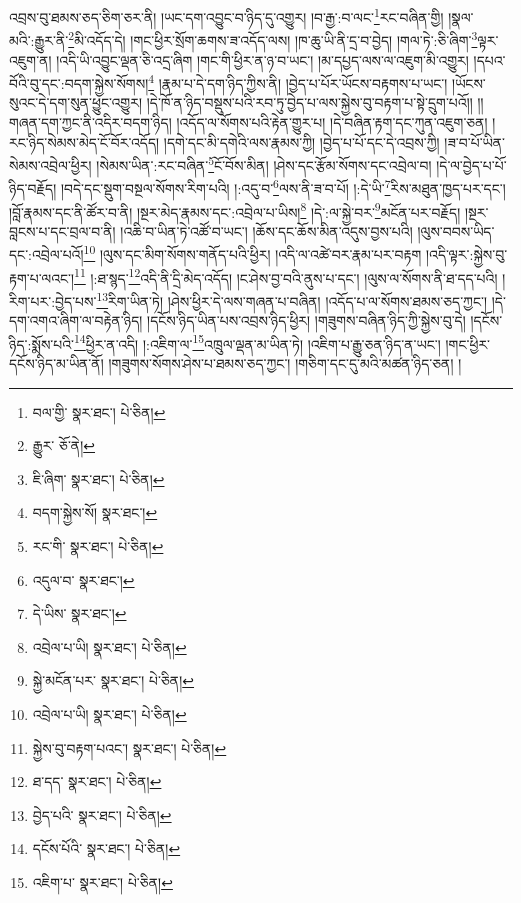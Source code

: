 འབྲས་བུ་ཐམས་ཅད་ཅིག་ཅར་ནི། །ཡང་དག་འབྱུང་བ་ཉིད་དུ་འགྱུར། །བ་རྒྱ་:བ་ལང་\footnote{བལ་གྱི་  སྣར་ཐང་།  པེ་ཅིན། }རང་བཞིན་གྱི། །སྣལ་མའི་:རྒྱུར་ནི་\footnote{རྒྱུར་  ཅོ་ནེ། }མི་འདོད་དེ། །གང་ཕྱིར་སྲོག་ཆགས་ཟ་འདོད་ལས། །ཁ་ཆུ་ཡི་ནི་དྲ་བ་བྱེད། །གལ་ཏེ་:ཅི་ཞིག་\footnote{ཇི་ཞིག་  སྣར་ཐང་།  པེ་ཅིན། }ལྟར་འཇུག་ན། །འདི་ཡི་འབྱུང་ལྡན་ཅི་འདྲ་ཞིག །གང་གི་ཕྱིར་ན་ཉ་བ་ཡང་། །མ་དཔྱད་ལས་ལ་འཇུག་མི་འགྱུར། །དཔའ་བོའི་བུ་དང་:བདག་སྐྱེས་སོགས།\footnote{བདག་སྐྱེས་སོ།  སྣར་ཐང་། } །རྣམ་པ་དེ་དག་ཉིད་ཀྱིས་ནི། །བྱེད་པ་པོར་ཡོངས་བརྟགས་པ་ཡང་། །ཡོངས་སུའང་དེ་དག་སུན་ཕྱུང་འགྱུར། །དེ་ཁོ་ན་ཉིད་བསྡུས་པའི་རབ་ཏུ་བྱེད་པ་ལས་སྐྱེས་བུ་བརྟག་པ་སྟེ་དྲུག་པའོ།། །།གཞན་དག་ཀྱང་ནི་འདིར་བདག་ཉིད། །འདོད་ལ་སོགས་པའི་རྟེན་གྱུར་པ། །དེ་བཞིན་རྟག་དང་ཀུན་འཇུག་ཅན། །རང་ཉིད་སེམས་མེད་ངོ་བོར་འདོད། །དགེ་དང་མི་དགེའི་ལས་རྣམས་ཀྱི། །བྱེད་པ་པོ་དང་དེ་འབྲས་ཀྱི། །ཟ་བ་པོ་ཡིན་སེམས་འབྲེལ་ཕྱིར། །སེམས་ཡིན་:རང་བཞིན་\footnote{རང་གི་  སྣར་ཐང་།  པེ་ཅིན། }ངོ་བོས་མིན། །ཤེས་དང་རྩོམ་སོགས་དང་འབྲེལ་བ། །དེ་ལ་བྱེད་པ་པོ་ཉིད་བརྗོད། །བདེ་དང་སྡུག་བསྔལ་སོགས་རིག་པའི། །:འདུ་བ་\footnote{འདུལ་བ་  སྣར་ཐང་། }ལས་ནི་ཟ་བ་པོ། །:དེ་ཡི་\footnote{དེ་ཡིས་  སྣར་ཐང་། }རིས་མཐུན་ཁྱད་པར་དང་། །བློ་རྣམས་དང་ནི་ཚོར་བ་ནི། །སྔར་མེད་རྣམས་དང་:འབྲེལ་པ་ཡིས།\footnote{འབྲེལ་པ་ཡི།  སྣར་ཐང་།  པེ་ཅིན། } །དེ་:ལ་སྐྱེ་བར་\footnote{སྐྱེ་མངོན་པར་  སྣར་ཐང་།  པེ་ཅིན། }མངོན་པར་བརྗོད། །སྔར་བླངས་པ་དང་བྲལ་བ་ནི། །འཆི་བ་ཡིན་ཏེ་འཚོ་བ་ཡང་། །ཆོས་དང་ཆོས་མིན་འདུས་བྱས་པའི། །ལུས་བབས་ཡིད་དང་:འབྲེལ་པའོ།\footnote{འབྲེལ་པ་ཡི།  སྣར་ཐང་།  པེ་ཅིན། } །ལུས་དང་མིག་སོགས་གནོད་པའི་ཕྱིར། །འདི་ལ་འཚེ་བར་རྣམ་པར་བརྟག །འདི་ལྟར་:སྐྱེས་བུ་རྟག་པ་ལའང་།\footnote{སྐྱེས་བུ་བརྟག་པའང་།  སྣར་ཐང་།  པེ་ཅིན། } །:ཐ་སྙད་\footnote{ཐ་དད་  སྣར་ཐང་།  པེ་ཅིན། }འདི་ནི་དྲི་མེད་འདོད། །ང་ཤེས་བྱ་བའི་ནུས་པ་དང་། །ལུས་ལ་སོགས་ནི་ཐ་དད་པའི། །རིག་པར་:བྱེད་པས་\footnote{བྱེད་པའི་  སྣར་ཐང་།  པེ་ཅིན། }རིག་ཡིན་ཏེ། །ཤེས་ཕྱིར་དེ་ལས་གཞན་པ་བཞིན། །འདོད་པ་ལ་སོགས་ཐམས་ཅད་ཀྱང་། །དེ་དག་འགའ་ཞིག་ལ་བརྟེན་ཉིད། །དངོས་ཉིད་ཡིན་པས་འབྲས་ཉིད་ཕྱིར། །གཟུགས་བཞིན་ཉིད་ཀྱི་སྐྱེས་བུ་དེ། །དངོས་ཉིད་:སྨོས་པའི་\footnote{དངོས་པོའི་  སྣར་ཐང་།  པེ་ཅིན། }ཕྱིར་ན་འདི། །:འཇིག་ལ་\footnote{འཇིག་པ་  སྣར་ཐང་།  པེ་ཅིན། }འཁྲུལ་ལྡན་མ་ཡིན་ཏེ། །འཇིག་པ་རྒྱུ་ཅན་ཉིད་ན་ཡང་། །གང་ཕྱིར་དངོས་ཉིད་མ་ཡིན་ནོ། །གཟུགས་སོགས་ཤེས་པ་ཐམས་ཅད་ཀྱང་། །གཅིག་དང་དུ་མའི་མཚན་ཉིད་ཅན། །
